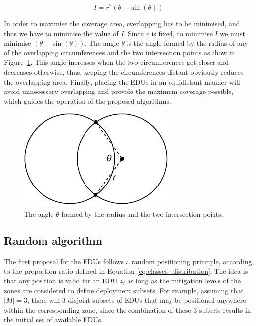 \begin{refsection}
\begin{equation}
    I = r^2(\theta - \sin(\theta))
    \label{eq:overlapping_area}
\end{equation}

In order to maximise the coverage area, overlapping has to be minimised, and thus we have to minimise the value of $I$. Since $r$ is fixed, to minimise $I$ we must minimise $(\theta - \sin(\theta))$. The angle $\theta$ is the angle formed by the radius of any of the overlapping circumferences and the two intersection points as show in Figure~\ref{fig:circle_intersection}. This angle increases when the two circumferences get closer and decreases otherwise, thus, keeping the circumferences distant obviously reduces the overlapping area. Finally, placing the EDUs in an equidistant manner will avoid unnecessary overlapping and provide the maximum coverage possible, which guides the operation of the proposed algorithms.

\begin{figure}[htbp]
    \centering
    \includegraphics{Chapters/2-EDUs/images/circumferences_overlapping.pdf}
    \caption{The angle $\theta$ formed by the radius and the two intersection points.}
    \label{fig:circle_intersection}
\end{figure}

\subsection {Random algorithm}

The first proposal for the EDUs follows a random positioning principle, according to the proportion ratio defined in Equation \ref{eq:classes_distribution}. The idea is that any position is valid for an EDU $z_i$ as long as the mitigation levels of the zones are considered to define deployment subsets. For example, assuming that $|M|=3$, there will 3 disjoint subsets of EDUs that may be positioned anywhere within the corresponding zone, since the combination of these 3 subsets results in the initial set of available EDUs.


\end{refsection}
